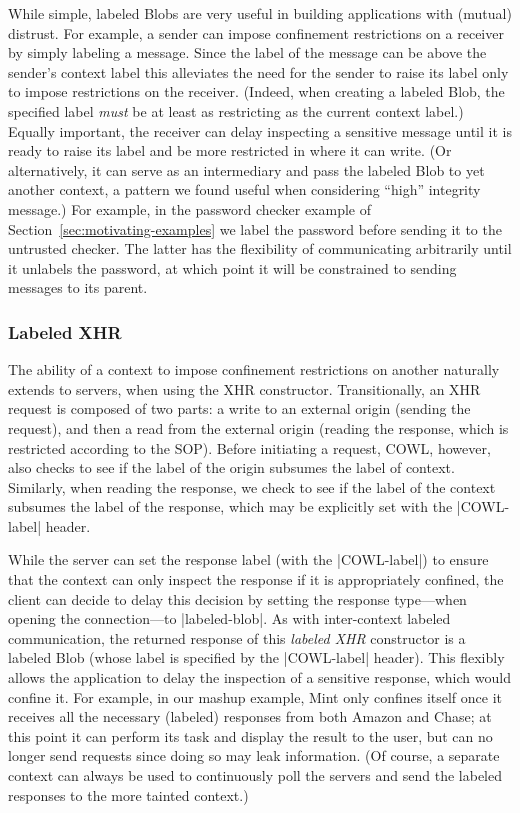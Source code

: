 While simple, labeled Blobs are very useful in building applications
with (mutual) distrust.
%
For example, a sender can impose confinement restrictions on a
receiver by simply labeling a message.
%
Since the label of the message can be above the sender's context label
this alleviates the need for the sender to raise its label only to
impose restrictions on the receiver.
%
(Indeed, when creating a labeled Blob, the specified label \emph{must}
be at least as restricting as the current context label.)
%
Equally important, the receiver can delay inspecting a sensitive
message until it is ready to raise its label and be more restricted in
where it can write.
%
(Or alternatively, it can serve as an intermediary and pass the
labeled Blob to yet another context, a pattern we found useful when
considering ``high'' integrity message.)
%
For example, in the password checker example of
Section~\ref{sec:motivating-examples} we label the password
 before sending it to the untrusted checker.
%
The latter has the flexibility of communicating arbitrarily until it
unlabels the password, at which point it will be constrained to
sending messages to its parent.

\subsubsection{Labeled XHR}
\label{sec:system:labeled-xhr}
The ability of a context to impose confinement restrictions on
another naturally extends to servers, when using the XHR constructor.
% 
Transitionally, an XHR request is composed of two parts: a write to an
external origin (sending the request), and then a read from the external
origin (reading the response, which is restricted according to the
SOP).
%
Before initiating a request, COWL, however, also checks to see
if the label of the origin subsumes the label of context. 
%
Similarly, when reading the response, we check to see if the label of
the context subsumes the label of the response, which may be
explicitly set with the \js|COWL-label| header.
%

While the server can set the response label (with the \js|COWL-label|)
to ensure that the context can only inspect the response if it is
appropriately confined, the client can decide to delay this decision by
setting the response type---when opening the connection---to
\js|labeled-blob|.
%
As with inter-context labeled communication, the returned response
of this \emph{labeled XHR} constructor is a labeled Blob (whose label
is specified by the \js|COWL-label| header).
%
This flexibly allows the application to delay the inspection of a
sensitive response, which would confine it.
%
For example, in our mashup example, Mint only confines itself once it
receives all the necessary (labeled) responses from both Amazon and
Chase; at this point it can perform its task and display the result to
the user, but can no longer send requests since doing so may leak
information.
%
(Of course, a separate context can always be used to continuously poll
the servers and send the labeled responses to the more tainted
context.)


